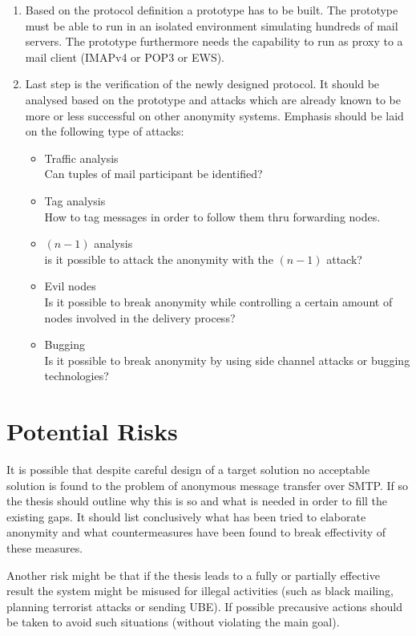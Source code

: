 \documentclass[twocolumn,a4paper,10pt,english]{scrartcl}
\newenvironment{myitemize}{\begin{itemize}\setlength{\itemsep}{0em}}{\end{itemize}}
\begin{document}
\begin{enumerate}
\item Based on the protocol definition a prototype has to be built. The prototype must be able to run in an isolated environment simulating hundreds of mail servers. The prototype furthermore needs the capability to run as proxy to a mail client (IMAPv4 or POP3 or EWS).\par

\item Last step is the verification of the newly designed protocol. It should be analysed based on the prototype and attacks which are already known to be more or less successful on other anonymity systems. Emphasis should be laid on the following type of attacks:\par
\begin{myitemize}
\item Traffic analysis\\Can tuples of mail participant be identified?  
\item Tag analysis\\How to tag messages in order to follow them thru forwarding nodes.
\item $(n-1)$ analysis\\is it possible to attack the anonymity with the $(n-1)$ attack?
\item Evil nodes\\ Is it possible to break anonymity while controlling a certain amount of nodes involved in the delivery process?
\item Bugging\\Is it possible to break anonymity by using side channel attacks or bugging technologies?
\end{myitemize}
\end{enumerate}

\section{Potential Risks}
It is possible that despite careful design of a target solution no acceptable solution is found to the problem of anonymous message transfer over SMTP. If so the thesis should outline why this is so and what is needed in order to fill the existing gaps. It should list conclusively what has been tried to elaborate anonymity and what countermeasures have been found to break effectivity of these measures.\par

Another risk might be that if the thesis leads to a fully or partially effective result the system might be misused for illegal activities (such as black mailing, planning terrorist attacks or sending UBE). If possible precausive actions should be taken to avoid such situations (without violating the main goal).\par
\end{document}
